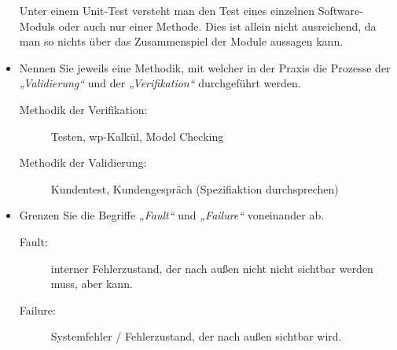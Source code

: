 \documentclass{lehramt-informatik-minimal}
\begin{document}
\begin{itemize}
\begin{antwort}
Unter einem Unit-Test versteht man den Test eines einzelnen
Software-Moduls oder auch nur einer Methode. Dies ist allein nicht
ausreichend, da man so nichts über das Zusammenspiel der Module aussagen
kann.
\end{antwort}

%

\item Nennen Sie jeweils eine Methodik, mit welcher in der Praxis die
Prozesse der \emph{„Validierung“} und der \emph{„Verifikation“}
durchgeführt werden.

\begin{antwort}
\begin{description}
\item[Methodik der Verifikation:]
Testen, wp-Kalkül, Model Checking

\item[Methodik der Validierung:]
Kundentest, Kundengespräch (Spezifiaktion durchsprechen)
\end{description}
\end{antwort}

%

\item Grenzen Sie die Begriffe \emph{„Fault“} und \emph{„Failure“}
voneinander ab.

\begin{antwort}

\begin{description}
\item[Fault:]
interner Fehlerzustand, der nach außen nicht nicht sichtbar werden muss,
aber kann.

\item[Failure:]
Systemfehler / Fehlerzustand, der nach außen sichtbar wird.
\end{description}

\end{antwort}

\end{itemize}
\end{document}
